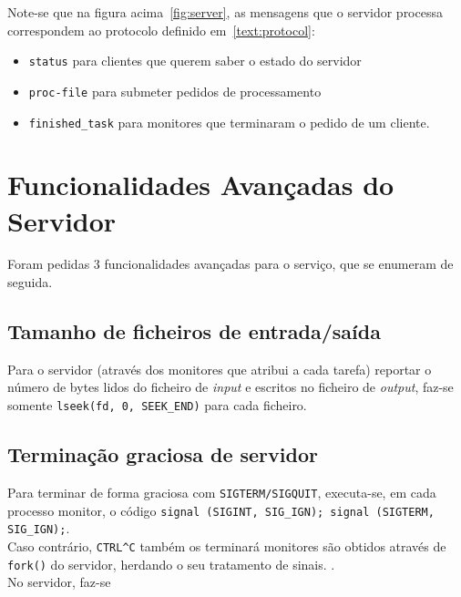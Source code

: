 \documentclass[11pt,a4paper]{report}%
\begin{document}
Note-se que na figura acima~\ref{fig:server}, as mensagens que o servidor processa
correspondem ao protocolo definido em~\ref{text:protocol}:
\begin{itemize}
  \item \lstinline{status} para clientes que querem saber o estado do servidor
  \item \lstinline{proc-file} para submeter pedidos de processamento
  \item \lstinline{finished_task} para monitores que terminaram o pedido de um cliente.
\end{itemize}

\section{Funcionalidades Avançadas do Servidor}

Foram pedidas 3 funcionalidades avançadas para o serviço, que se enumeram de seguida.

\subsection{Tamanho de ficheiros de entrada/saída}
Para o servidor (através dos monitores que atribui a cada tarefa) reportar
o número de bytes lidos do ficheiro de \textit{input} e escritos no ficheiro de \textit{output},
faz-se somente \lstinline{lseek(fd, 0, SEEK_END)} para cada ficheiro.

\subsection{Terminação graciosa de servidor}
Para terminar de forma graciosa com \lstinline{SIGTERM/SIGQUIT}, executa-se, em cada processo monitor,
o código \lstinline{signal (SIGINT, SIG_IGN); signal (SIGTERM, SIG_IGN);}.\\
Caso contrário, \lstinline{CTRL^C} também os terminará \textemdash monitores são obtidos através de
\lstinline{fork()} do servidor, herdando o seu tratamento de sinais. \textemdash.\\
No servidor, faz-se

\end{document}
